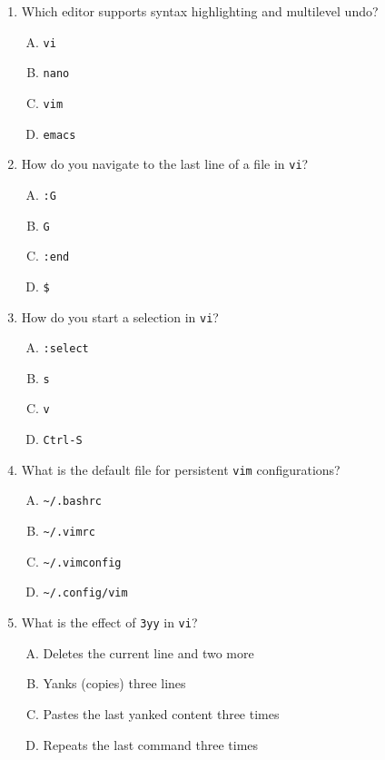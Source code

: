 \documentclass[a4paper]{report}
\begin{document}
\begin{enumerate}[1.]
    \item Which editor supports syntax highlighting and multilevel undo?  
    \begin{enumerate}[A)]
        \item \texttt{vi}  
        \item \texttt{nano}  
        \item \texttt{vim}  
        \item \texttt{emacs}  
    \end{enumerate}

    \item How do you navigate to the last line of a file in \texttt{vi}?  
    \begin{enumerate}[A)]
        \item \texttt{:G}  
        \item \texttt{G}  
        \item \texttt{:end}  
        \item \texttt{\$}  
    \end{enumerate}

    \item How do you start a selection in \texttt{vi}?  
    \begin{enumerate}[A)]
        \item \texttt{:select}  
        \item \texttt{s}  
        \item \texttt{v}  
        \item \texttt{Ctrl-S}  
    \end{enumerate}

    \item What is the default file for persistent \texttt{vim} configurations?  
    \begin{enumerate}[A)]
        \item \texttt{\textasciitilde/.bashrc}  
        \item \texttt{\textasciitilde/.vimrc}  
        \item \texttt{\textasciitilde/.vimconfig}  
        \item \texttt{\textasciitilde/.config/vim}  
    \end{enumerate}

    \item What is the effect of \texttt{3yy} in \texttt{vi}?  
    \begin{enumerate}[A)]
        \item Deletes the current line and two more  
        \item Yanks (copies) three lines  
        \item Pastes the last yanked content three times  
        \item Repeats the last command three times  
    \end{enumerate}


\end{enumerate}
\end{document}
